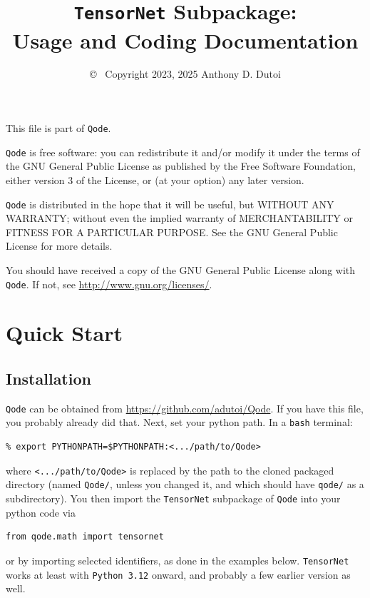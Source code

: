 \documentclass[12pt,letterpaper]{article}
\begin{document}
\title{\texttt{TensorNet} Subpackage:\\Usage and Coding Documentation}
\author{\copyright~ Copyright 2023, 2025 Anthony D. Dutoi}
\date{}
\maketitle

This file is part of \texttt{Qode}.
 
\texttt{Qode} is free software: you can redistribute it and/or modify
it under the terms of the GNU General Public License as published by
the Free Software Foundation, either version 3 of the License, or
(at your option) any later version.
 
\texttt{Qode} is distributed in the hope that it will be useful,
but WITHOUT ANY WARRANTY; without even the implied warranty of
MERCHANTABILITY or FITNESS FOR A PARTICULAR PURPOSE.  See the
GNU General Public License for more details.
 
You should have received a copy of the GNU General Public License
along with \texttt{Qode}.  If not, see \url{http://www.gnu.org/licenses/}.



		\section{Quick Start}

	\subsection{Installation}

\texttt{Qode} can be obtained from \url{https://github.com/adutoi/Qode}.
If you have this file, you probably already did that.  Next, set your python path.
In a \texttt{bash} terminal:
\begin{lstlisting}
% export PYTHONPATH=$PYTHONPATH:<.../path/to/Qode>
\end{lstlisting}
where \texttt{<.../path/to/Qode>} is replaced by the path to the cloned packaged directory
(named \texttt{Qode/}, unless you changed it, and which should have \texttt{qode/} as a subdirectory).
You then import the \texttt{TensorNet} subpackage of \texttt{Qode} into your python code via
\begin{lstlisting}
from qode.math import tensornet
\end{lstlisting}
or by importing selected identifiers, as done in the examples below.
\texttt{TensorNet} works at least with \texttt{Python 3.12} onward, and probably
 a few earlier version as well.
\end{document}
